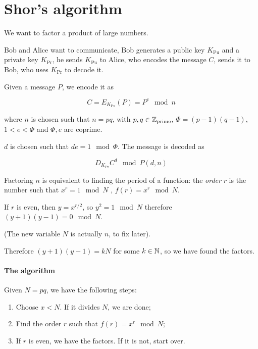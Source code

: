 \section{Shor's algorithm}

We want to factor a product of large numbers.

Bob and Alice want to communicate, Bob generates a public key \( K _{\text{Pu}} \) and a private key \( K _{\text{Pr}}  \), he sends \( K _{\text{Pu}} \) to Alice, who encodes the message \( C \), sends it to Bob, who uses \( K _{\text{Pr}} \) to decode it.

Given a message \( P \), we encode it as

\begin{equation}
  C = E _{K _{\text{Pu}} } (P) = P ^e \mod n
\end{equation}

where \( n \) is chosen such that \( n = pq \), with \( p, q \in \mathbb{Z}_{\text{prime}} \), \(\Phi = (p-1) (q-1)\), \( 1<e<\Phi \) and \( \Phi, e \)  are coprime.

\( d \) is chosen such that \( de = 1 \mod \Phi \).
The message is decoded as

\begin{equation}
  D _{K _{\text{Pr}}} C^d \mod P (d, n)
\end{equation}

Factoring \( n \) is equivalent to finding the period of a function: the \emph{order} \( r \) is the number such that \( x ^{r} = 1 \mod N  \) , \( f(r) = x^r \mod N \).

If \( r \) is even, then \( y = x ^{r/2}  \), so \( y^2 = 1 \mod N \) therefore \( (y+1)(y-1) = 0 \mod N \).

(The new variable \( N \)  is actually \( n \), to fix later).

Therefore \( (y+1)(y-1) = kN \) for some \( k \in \mathbb{N} \), so we have found the factors.

\paragraph{The algorithm}

Given \( N = pq \), we have the following steps:

\begin{enumerate}
  \item Choose \( x<N \). If it divides \( N \), we are done;
  \item Find the order \( r \) such that \( f(r) = x^r \mod N \); \label{item:qft}
  \item If \( r \) is even, we have the factors. If it is not, start over.
\end{enumerate}


